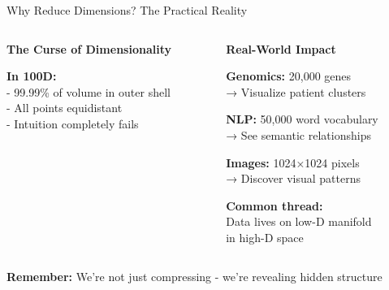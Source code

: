 \documentclass[10pt]{beamer}
\newcommand{\emphtext}[1]{\textcolor{upcblue}{\textbf{#1}}}
\newcommand{\warningbox}[1]{\colorbox{red!10}{\begin{minipage}{0.85\textwidth}\centering #1\end{minipage}}}
\begin{document}
\begin{frame}{Why Reduce Dimensions? The Practical Reality}
\begin{columns}[T]
\begin{column}{0.48\textwidth}
\emphtext{The Curse of Dimensionality}


\footnotesize
\textbf{In 100D:}\\
- 99.99\% of volume in outer shell\\
- All points equidistant\\
- Intuition completely fails
\end{column}

\begin{column}{0.48\textwidth}
\emphtext{Real-World Impact}

\footnotesize
\textbf{Genomics:} 20,000 genes\\
→ Visualize patient clusters

\textbf{NLP:} 50,000 word vocabulary\\
→ See semantic relationships

\textbf{Images:} 1024×1024 pixels\\
→ Discover visual patterns

\vspace{0.2cm}
\textbf{Common thread:}\\
Data lives on low-D manifold\\
in high-D space
\end{column}
\end{columns}

\vspace{0.3cm}
\begin{center}
\warningbox{\footnotesize\textbf{Remember:} We're not just compressing - we're revealing hidden structure}
\end{center}
\end{frame}
\end{document}
